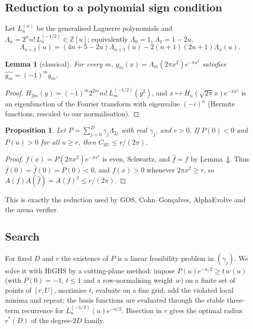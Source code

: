 \documentclass[11pt]{article}
\numberwithin{equation}{section}
\newtheorem{proposition}[theorem]{Proposition}
\newtheorem{lemma}[theorem]{Lemma}
\theoremstyle{definition}
\theoremstyle{remark}
\begin{document}
\subsection{Reduction to a polynomial sign condition}
Let $L_n^{(\alpha)}$ be the generalised Laguerre polynomials and
$\Lambda_n=2^n n!\,L_n^{(-1/2)}\in\mathbb Z[u]$; equivalently $\Lambda_0=1$, $\Lambda_1=1-2u$,
\begin{equation}\label{eq:lamrec}
\Lambda_{n+2}(u)=(4n+5-2u)\Lambda_{n+1}(u)-2(n+1)(2n+1)\Lambda_n(u).
\end{equation}
\begin{lemma}[classical]\label{lem:eig}
For every $m$, $g_m(x)=\Lambda_{m}(2\pi x^2)e^{-\pi x^2}$ satisfies $\widehat{g_m}=(-1)^m g_m$.
\end{lemma}
\begin{proof}
$H_{2m}(y)=(-1)^m2^{2m}m!\,L_m^{(-1/2)}(y^2)$, and $x\mapsto H_n(\sqrt{2\pi}x)e^{-\pi x^2}$ is an eigenfunction
of the Fourier transform with eigenvalue $(-i)^n$ (Hermite functions, rescaled to our normalisation).
\end{proof}
\begin{proposition}\label{prop:su}
Let $P=\sum_{j=0}^{D}\gamma_j\Lambda_{2j}$ with real $\gamma_j$, and $r>0$. If $P(0)<0$ and $P(u)>0$ for all
$u\ge r$, then $C_{\mathrm{SU}}\le r/(2\pi)$.
\end{proposition}
\begin{proof}
$f(x)=P(2\pi x^2)e^{-\pi x^2}$ is even, Schwartz, and $\widehat f=f$ by Lemma~\ref{lem:eig}. Thus
$f(0)=\widehat f(0)=P(0)<0$, and $f(x)>0$ whenever $2\pi x^2\ge r$, so
$A(f)A(\widehat f)=A(f)^2\le r/(2\pi)$.
\end{proof}
This is exactly the reduction used by GOS, Cohn--Gonçalves, AlphaEvolve and the arena verifier.

\subsection{Search}
For fixed $D$ and $r$ the existence of $P$ is a linear feasibility problem in $(\gamma_j)$. We solve it with
HiGHS by a cutting-plane method: impose $P(u)e^{-u/2}\ge t\,w(u)$ (with $P(0)=-1$, $t\le1$ and a
row-normalising weight $w$) on a finite set of points of $[r,U]$, maximise $t$, evaluate on a fine grid,
add the violated local minima and repeat; the basis functions are evaluated through the stable three-term
recurrence for $L_n^{(-1/2)}(u)e^{-u/2}$. Bisection in $r$ gives the optimal radius $r^*(D)$ of the
degree-$2D$ family.
\end{document}
